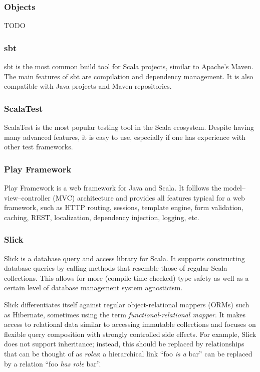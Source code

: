 \subsubsection{Objects}
TODO

\subsubsection{sbt}
sbt is the most common build tool for Scala projects, similar to Apache's Maven.
The main features of sbt are compilation and dependency management.
It is also compatible with Java projects and Maven repositories.

\subsubsection{ScalaTest}
ScalaTest is the most popular testing tool in the Scala ecosystem.
Despite having many advanced features, it is easy to use, especially if one has experience with other test frameworks.

\subsubsection{Play Framework}
Play Framework is a web framework for Java and Scala.
It folllows the model--view--controller (MVC) architecture and provides all features typical for a web framework, such as  HTTP routing, sessions, template engine, form validation, caching, REST, localization, dependency injection, logging, etc.


\subsubsection{Slick}
Slick is a database query and access library for Scala.
It supports constructing database queries by calling methods that resemble those of regular Scala collections.
This allows for more (compile-time checked) type-safety as well as a certain level of database management system agnosticism.

Slick differentiates itself against regular object-relational mappers (ORMs) such as Hibernate, sometimes using the term \textit{functional-relational mapper}.
It makes access to relational data similar to accessing immutable collections and focuses on flexible query composition with strongly controlled side effects.
For example, Slick does not support inheritance; instead, this should be replaced by relationships that can be thought of as \textit{roles}: a hierarchical link \enquote{foo \textit{is a} bar} can be replaced by a relation \enquote{foo \textit{has role} bar}.

